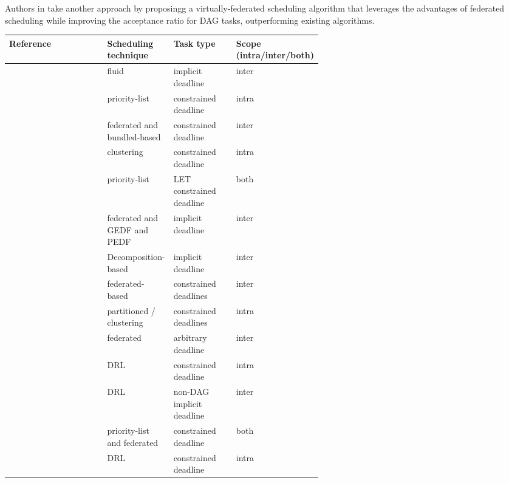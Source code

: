 Authors in \cite{JiangVirtuallyFederatedSched2021}
take another approach by proposingg a virtually-federated 
scheduling algorithm that leverages the advantages
of federated scheduling while improving the acceptance 
ratio for DAG tasks, outperforming existing algorithms.


\begin{table}
    \centering
    \begin{tabular}[]{|l|p{0.20\linewidth}|p{0.20\linewidth}|p{0.20\linewidth}|}
        \hline
        \textbf{Reference} & \textbf{Scheduling technique} & \textbf{Task type} & \textbf{Scope (intra/inter/both)}\\
        \hline
        \cite{guan2021DAGfluid} & fluid & implicit deadline & inter\\
        \hline
        \cite{He2019DagIntra} & priority-list & constrained deadline & intra \\
        \hline
        \cite{Kobayashi2023FedBundledDagsched} & federated and bundled-based & constrained deadline & inter\\
        \hline
        \cite{Xiao2019}  & clustering & constrained deadline & intra\\ 
        \hline
        \cite{Igarashi2020HeuristicContentionFree}  & priority-list & LET constrained deadline & both \\
        \hline
        \cite{jiangUtilTensityBound}  & federated and GEDF and PEDF & implicit deadline & inter\\
        \hline
        \cite{JiangDecompoSchedParallelTask} & Decomposition-based & implicit deadline & inter \\
        \hline
        \cite{He2023DegreeOfParallelism} & federated-based & constrained deadlines & inter \\
        \hline
        \cite{Shi2024DagExecGroups}  & partitioned / clustering & constrained deadlines & intra\\
        \hline
        \cite{Guan2023FederatedNew}  & federated & arbitrary deadline & inter\\
        \hline
        \cite{Zhao2024GATDRLmodel} & DRL & constrained deadline & intra\\
        \hline
        \cite{Xu2023DRLtaskSched} & DRL & non-DAG implicit deadline & inter\\
        \hline
        \cite{Zhao2022DAGsched} & priority-list and federated & constrained deadline & both \\
        \hline
        \cite{Lee2021GlobalDagSchedDRL} & DRL & constrained deadline & intra\\

\end{tabular}
\end{table}
